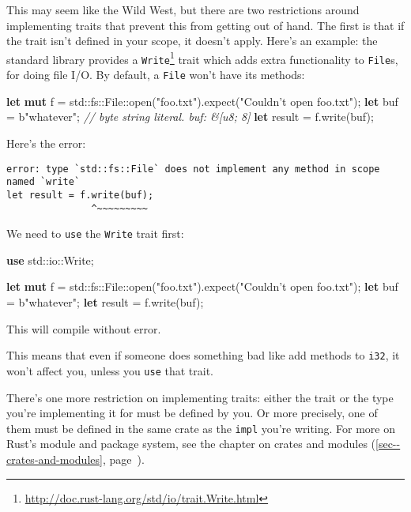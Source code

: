 \documentclass[a4paper,]{book}
\renewcommand*{\hyperref}[2][\ar]{%
  \def\ar{#2}%
  #2 (\autoref{#1}, page~\pageref{#1})}
\newenvironment{Shaded}{\begin{snugshade}}{\end{snugshade}}
\newcommand{\KeywordTok}[1]{\textcolor[rgb]{0.13,0.29,0.53}{\textbf{{#1}}}}
\newcommand{\StringTok}[1]{\textcolor[rgb]{0.31,0.60,0.02}{{#1}}}
\newcommand{\CommentTok}[1]{\textcolor[rgb]{0.56,0.35,0.01}{\textit{{#1}}}}
\newcommand{\NormalTok}[1]{{#1}}
\renewcommand{\href}[2]{#2\footnote{\url{#1}}}
\begin{document}
This may seem like the Wild West, but there are two restrictions around
implementing traits that prevent this from getting out of hand. The
first is that if the trait isn't defined in your scope, it doesn't
apply. Here's an example: the standard library provides a
\href{http://doc.rust-lang.org/std/io/trait.Write.html}{\texttt{Write}}
trait which adds extra functionality to \texttt{File}s, for doing file
I/O. By default, a \texttt{File} won't have its methods:

\begin{Shaded}
\begin{Highlighting}[]
\KeywordTok{let} \KeywordTok{mut} \NormalTok{f = std::fs::File::open(}\StringTok{"foo.txt"}\NormalTok{).expect(}\StringTok{"Couldn’t open foo.txt"}\NormalTok{);}
\KeywordTok{let} \NormalTok{buf = b}\StringTok{"whatever"}\NormalTok{; }\CommentTok{// byte string literal. buf: &[u8; 8]}
\KeywordTok{let} \NormalTok{result = f.write(buf);}
\end{Highlighting}
\end{Shaded}

Here's the error:

\begin{verbatim}
error: type `std::fs::File` does not implement any method in scope named `write`
let result = f.write(buf);
               ^~~~~~~~~~
\end{verbatim}

We need to \texttt{use} the \texttt{Write} trait first:

\begin{Shaded}
\begin{Highlighting}[]
\KeywordTok{use} \NormalTok{std::io::Write;}

\KeywordTok{let} \KeywordTok{mut} \NormalTok{f = std::fs::File::open(}\StringTok{"foo.txt"}\NormalTok{).expect(}\StringTok{"Couldn’t open foo.txt"}\NormalTok{);}
\KeywordTok{let} \NormalTok{buf = b}\StringTok{"whatever"}\NormalTok{;}
\KeywordTok{let} \NormalTok{result = f.write(buf);}
\end{Highlighting}
\end{Shaded}

This will compile without error.

This means that even if someone does something bad like add methods to
\texttt{i32}, it won't affect you, unless you \texttt{use} that trait.

There's one more restriction on implementing traits: either the trait or
the type you're implementing it for must be defined by you. Or more
precisely, one of them must be defined in the same crate as the
\texttt{impl} you're writing. For more on Rust's module and package
system, see the chapter on \hyperref[sec--crates-and-modules]{crates and
modules}.
\end{document}
